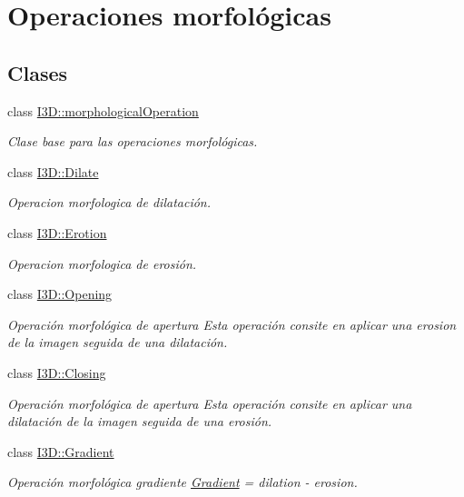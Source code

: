 \hypertarget{group___morph_oper}{}\section{Operaciones morfológicas}
\label{group___morph_oper}
\subsection*{Clases}
\begin{DoxyCompactItemize}
\item 
class \hyperlink{class_i3_d_1_1morphological_operation}{I3\+D\+::morphological\+Operation}
\begin{DoxyCompactList}\small\item\em Clase base para las operaciones morfológicas. \end{DoxyCompactList}\item 
class \hyperlink{class_i3_d_1_1_dilate}{I3\+D\+::\+Dilate}
\begin{DoxyCompactList}\small\item\em Operacion morfologica de dilatación. \end{DoxyCompactList}\item 
class \hyperlink{class_i3_d_1_1_erotion}{I3\+D\+::\+Erotion}
\begin{DoxyCompactList}\small\item\em Operacion morfologica de erosión. \end{DoxyCompactList}\item 
class \hyperlink{class_i3_d_1_1_opening}{I3\+D\+::\+Opening}
\begin{DoxyCompactList}\small\item\em Operación morfológica de apertura Esta operación consite en aplicar una erosion de la imagen seguida de una dilatación. \end{DoxyCompactList}\item 
class \hyperlink{class_i3_d_1_1_closing}{I3\+D\+::\+Closing}
\begin{DoxyCompactList}\small\item\em Operación morfológica de apertura Esta operación consite en aplicar una dilatación de la imagen seguida de una erosión. \end{DoxyCompactList}\item 
class \hyperlink{class_i3_d_1_1_gradient}{I3\+D\+::\+Gradient}
\begin{DoxyCompactList}\small\item\em Operación morfológica gradiente \hyperlink{class_i3_d_1_1_gradient}{Gradient} = dilation -\/ erosion. \end{DoxyCompactList}\item 

\end{DoxyCompactItemize}
